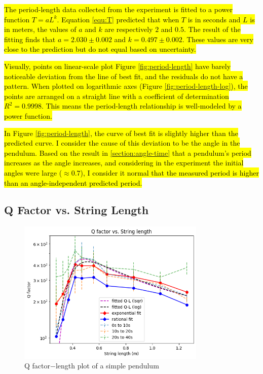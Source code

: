 \documentclass[12pt]{article}
\DeclareRobustCommand{\hlnew}[1]{{\sethlcolor{hlcnew}\hl{#1}}}
\begin{document}
\hlnew{The period-length data collected from the experiment is fitted to a power function $T=aL^k$. Equation {\ref{equ:T}} predicted that when $T$ is in seconds and $L$ is in meters, the values of $a$ and $k$ are respectively $2$ and $0.5$. The result of the fitting finds that $a=2.030\pm0.002$ and $k=0.497\pm0.002$. These values are very close to the prediction but do not equal based on uncertainty.}

\hlnew{Visually, points on linear-scale plot Figure {\ref{fig:period-length}} have barely noticeable deviation from the line of best fit, and the residuals do not have a pattern. When plotted on logarithmic axes (Figure {\ref{fig:period-length-log}}), the points are arranged on a straight line with a coefficient of determination $R^2=0.9998$. This means the period-length relationship is well-modeled by a power function.}

\hlnew{In Figure {\ref{fig:period-length}}, the curve of best fit is slightly higher than the predicted curve. I consider the cause of this deviation to be the angle in the pendulum. Based on the result in {\ref{section:angle-time}} that a pendulum's period increases as the angle increases, and considering in the experiment the initial angles were large ($\approx 0.7$), I consider it normal that the measured period is higher than an angle-independent predicted period.}


\subsection{Q Factor vs. String Length} \label{section:q-length}

\begin{figure}[!ht]
\begin{center}
\includegraphics[width=0.8\textwidth]{q-length.png}
\end{center}
\caption{Q factor$-$length plot of a simple pendulum}
\label{fig:q-length}
\end{figure}
\end{document}
